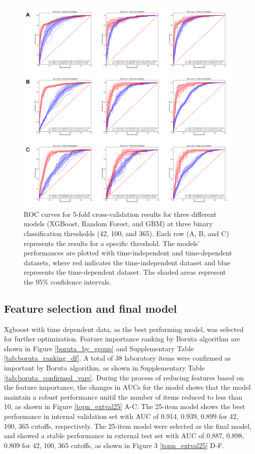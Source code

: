\documentclass[final,3p,times,authoryear]{elsarticle}
\begin{document}
\begin{figure}[t] 
    \centering 
    \includegraphics[width=\textwidth]{figures/kfoldfirst3.png} 
    \caption{ROC curves for 5-fold cross-validation results for three different models (XGBoost, Random Forest, and GBM) at three binary classification thresholds (42, 100, and 365). Each row (A, B, and C) represents the results for a specific threshold. The models' performances are plotted with time-independent and time-dependent datasets, where red indicates the time-independent dataset and blue represents the time-dependent dataset. The shaded areas represent the 95\% confidence intervals.}\label{kfoldfirst3} 
\end{figure}


\subsection{Feature selection and final model}\label{FinalModel}

Xgboost with time dependent data, as the best performing model, was selected for further optimization. Feature importance ranking by Boruta algorithm are shown in Figure \ref{boruta_by_group} and Supplementary Table \ref{tab:boruta_ranking_df}. A total of 38 laboratory items were confirmed as important by Boruta algorithm, as shown in Supplementary Table \ref{tab:boruta_confirmed_vars}. During the process of reducing features based on the feature importance, the changes in AUCs for the model shows that the model maintain a robust performance unitil the number of items reduced to less than 10, as shown in Figure \ref{topn_extval25} A-C. The 25-item model shows the best performance in internal validation set with AUC of 0.914, 0.939, 0.899 for 42, 100, 365 cutoffs, respectively. The 25-item model were selected as the final model, and showed a stable performance in external test set with AUC of 0.887, 0.898, 0.809 for 42, 100, 365 cutoffs, as shown in Figure 3 \ref{topn_extval25} D-F.
\end{document}
